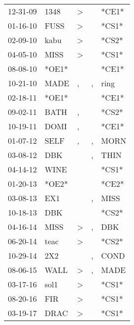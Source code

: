 \begin{supertabular}{p{0.07\textwidth}p{0.06\textwidth}p{0.02\textwidth}p{0.02\textwidth}p{0.06\textwidth}}
 12-31-09\textsuperscript{} &  1348\textsuperscript{} &  \textgreater &    &                   *CE1* \\
 01-16-10\textsuperscript{} &  FUSS\textsuperscript{} &  \textgreater &    &                   *CS1* \\
 02-09-10\textsuperscript{} &  kabu\textsuperscript{} &  \textgreater &    &                   *CS2* \\
 04-05-10\textsuperscript{} &  MISS\textsuperscript{} &  \textgreater &    &                   *CS1* \\
 08-08-10\textsuperscript{} &                   *OE1* &               &    &                   *CE1* \\
 10-21-10\textsuperscript{} &  MADE\textsuperscript{} &             , &  , &  ring\textsuperscript{} \\
 02-18-11\textsuperscript{} &                   *OE1* &               &    &                   *CE1* \\
 09-02-11\textsuperscript{} &  BATH\textsuperscript{} &             , &    &                   *CS2* \\
 10-19-11\textsuperscript{} &  DOMI\textsuperscript{} &             , &    &                   *CE1* \\
 01-07-12\textsuperscript{} &  SELF\textsuperscript{} &             , &  , &  MORN\textsuperscript{} \\
 03-08-12\textsuperscript{} &   DBK\textsuperscript{} &               &  , &  THIN\textsuperscript{} \\
 04-14-12\textsuperscript{} &  WINE\textsuperscript{} &               &    &                   *CS1* \\
 01-20-13\textsuperscript{} &                   *OE2* &               &    &                   *CE2* \\
 03-08-13\textsuperscript{} &   EX1\textsuperscript{} &               &  , &  MISS\textsuperscript{} \\
 10-18-13\textsuperscript{} &   DBK\textsuperscript{} &               &    &                   *CS2* \\
 04-16-14\textsuperscript{} &  MISS\textsuperscript{} &  \textgreater &  , &   DBK\textsuperscript{} \\
 06-20-14\textsuperscript{} &  teac\textsuperscript{} &  \textgreater &    &                   *CS2* \\
 10-29-14\textsuperscript{} &   2X2\textsuperscript{} &               &  , &  COND\textsuperscript{} \\
 08-06-15\textsuperscript{} &  WALL\textsuperscript{} &  \textgreater &  , &  MADE\textsuperscript{} \\
 03-17-16\textsuperscript{} &  sol1\textsuperscript{} &  \textgreater &    &                   *CS1* \\
 08-20-16\textsuperscript{} &   FIR\textsuperscript{} &  \textgreater &    &                   *CS1* \\
 03-19-17\textsuperscript{} &  DRAC\textsuperscript{} &  \textgreater &    &                   *CS1* \\
\end{supertabular}
